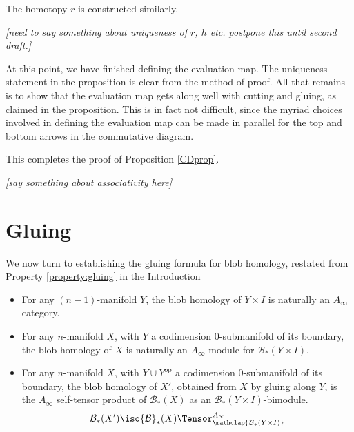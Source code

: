 \documentclass[11pt,leqno]{amsart}
\def\bc{{\mathcal B}}
\def\nn#1{{{\it \small [#1]}}}
\begin{document}
The homotopy $r$ is constructed similarly.

\nn{need to say something about uniqueness of $r$, $h$ etc.
postpone this until second draft.}

At this point, we have finished defining the evaluation map.
The uniqueness statement in the proposition is clear from the method of proof.
All that remains is to show that the evaluation map gets along well with cutting and gluing,
as claimed in the proposition.
This is in fact not difficult, since the myriad choices involved in defining the
evaluation map can be made in parallel for the top and bottom
arrows in the commutative diagram.

This completes the proof of Proposition \ref{CDprop}.

\medskip

\nn{say something about associativity here}

\section{Gluing}
\label{sec:gluing}%

We now turn to establishing the gluing formula for blob homology, restated from Property \ref{property:gluing} in the Introduction
\begin{itemize}
\item For any $(n-1)$-manifold $Y$, the blob homology of $Y \times I$ is
naturally an $A_\infty$ category. %

\item For any $n$-manifold $X$, with $Y$ a codimension $0$-submanifold of its boundary, the blob homology of $X$ is naturally an
$A_\infty$ module for $\bc_*(Y \times I)$.

\item For any $n$-manifold $X$, with $Y \cup Y^{\text{op}}$ a codimension
$0$-submanifold of its boundary, the blob homology of $X'$, obtained from
$X$ by gluing along $Y$, is the $A_\infty$ self-tensor product of
$\bc_*(X)$ as an $\bc_*(Y \times I)$-bimodule.
\begin{equation*}
\bc_*(X') \iso \bc_*(X) \Tensor^{A_\infty}_{\mathclap{\bc_*(Y \times I)}}
\end{equation*}
\end{itemize}
\end{document}
